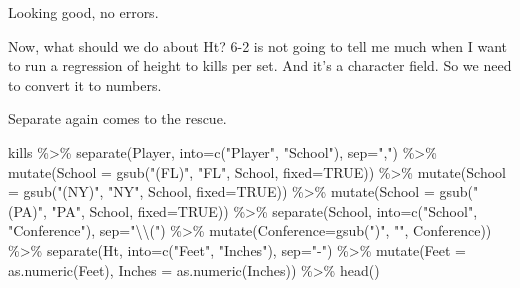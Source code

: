 \documentclass[
]{book}
\newenvironment{Shaded}{\begin{snugshade}}{\end{snugshade}}
\newcommand{\AttributeTok}[1]{\textcolor[rgb]{0.77,0.63,0.00}{#1}}
\newcommand{\ConstantTok}[1]{\textcolor[rgb]{0.00,0.00,0.00}{#1}}
\newcommand{\FunctionTok}[1]{\textcolor[rgb]{0.00,0.00,0.00}{#1}}
\newcommand{\NormalTok}[1]{#1}
\newcommand{\SpecialCharTok}[1]{\textcolor[rgb]{0.00,0.00,0.00}{#1}}
\newcommand{\StringTok}[1]{\textcolor[rgb]{0.31,0.60,0.02}{#1}}
\begin{document}
Looking good, no errors.

Now, what should we do about Ht? 6-2 is not going to tell me much when I want to run a regression of height to kills per set. And it's a character field. So we need to convert it to numbers.

Separate again comes to the rescue.

\begin{Shaded}
\begin{Highlighting}[]
\NormalTok{kills }\SpecialCharTok{\%\textgreater{}\%} 
  \FunctionTok{separate}\NormalTok{(Player, }\AttributeTok{into=}\FunctionTok{c}\NormalTok{(}\StringTok{"Player"}\NormalTok{, }\StringTok{"School"}\NormalTok{), }\AttributeTok{sep=}\StringTok{","}\NormalTok{) }\SpecialCharTok{\%\textgreater{}\%} 
  \FunctionTok{mutate}\NormalTok{(}\AttributeTok{School =} \FunctionTok{gsub}\NormalTok{(}\StringTok{"(FL)"}\NormalTok{, }\StringTok{"FL"}\NormalTok{, School, }\AttributeTok{fixed=}\ConstantTok{TRUE}\NormalTok{)) }\SpecialCharTok{\%\textgreater{}\%}
  \FunctionTok{mutate}\NormalTok{(}\AttributeTok{School =} \FunctionTok{gsub}\NormalTok{(}\StringTok{"(NY)"}\NormalTok{, }\StringTok{"NY"}\NormalTok{, School, }\AttributeTok{fixed=}\ConstantTok{TRUE}\NormalTok{)) }\SpecialCharTok{\%\textgreater{}\%}
  \FunctionTok{mutate}\NormalTok{(}\AttributeTok{School =} \FunctionTok{gsub}\NormalTok{(}\StringTok{"(PA)"}\NormalTok{, }\StringTok{"PA"}\NormalTok{, School, }\AttributeTok{fixed=}\ConstantTok{TRUE}\NormalTok{)) }\SpecialCharTok{\%\textgreater{}\%}
  \FunctionTok{separate}\NormalTok{(School, }\AttributeTok{into=}\FunctionTok{c}\NormalTok{(}\StringTok{"School"}\NormalTok{, }\StringTok{"Conference"}\NormalTok{), }\AttributeTok{sep=}\StringTok{"}\SpecialCharTok{\textbackslash{}\textbackslash{}}\StringTok{("}\NormalTok{) }\SpecialCharTok{\%\textgreater{}\%} 
  \FunctionTok{mutate}\NormalTok{(}\AttributeTok{Conference=}\FunctionTok{gsub}\NormalTok{(}\StringTok{")"}\NormalTok{, }\StringTok{""}\NormalTok{, Conference)) }\SpecialCharTok{\%\textgreater{}\%}
  \FunctionTok{separate}\NormalTok{(Ht, }\AttributeTok{into=}\FunctionTok{c}\NormalTok{(}\StringTok{"Feet"}\NormalTok{, }\StringTok{"Inches"}\NormalTok{), }\AttributeTok{sep=}\StringTok{"{-}"}\NormalTok{) }\SpecialCharTok{\%\textgreater{}\%}
  \FunctionTok{mutate}\NormalTok{(}\AttributeTok{Feet =} \FunctionTok{as.numeric}\NormalTok{(Feet), }\AttributeTok{Inches =} \FunctionTok{as.numeric}\NormalTok{(Inches)) }\SpecialCharTok{\%\textgreater{}\%}
  \FunctionTok{head}\NormalTok{()}
\end{Highlighting}
\end{Shaded}
\end{document}
